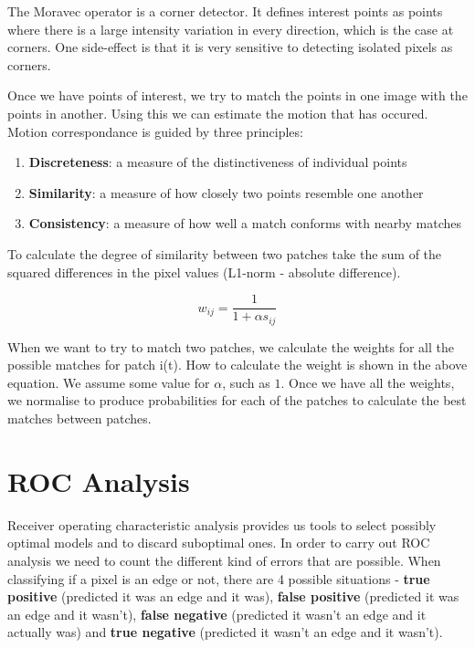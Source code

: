 \documentclass{article}
\begin{document}
	\par 
	The Moravec operator is a corner detector. It defines interest points as points where there is a large intensity variation in every direction, which is the case at corners. One side-effect is that it is very sensitive to detecting isolated pixels as corners.
	
	\par 
	Once we have points of interest, we try to match the points in one image with the points in another. Using this we can estimate the motion that has occured. Motion correspondance is guided by three principles:
	\begin{enumerate}
		\item \textbf{Discreteness}: a measure of the distinctiveness of individual points
		\item \textbf{Similarity}: a measure of how closely two points resemble one another
		\item \textbf{Consistency}: a measure of how well a match conforms with nearby matches
	\end{enumerate}
	
	To calculate the degree of similarity between two patches take the sum of the squared differences in the pixel values (L1-norm - absolute difference).
	
	\[ w_{ij} = \frac{1}{1 + \alpha s_{ij}} \]
	
	When we want to try to match two patches, we calculate the weights for all the possible matches for patch i(t). How to calculate the weight is shown in the above equation. We assume some value for $\alpha$, such as $1$. Once we have all the weights, we normalise to produce probabilities for each of the patches to calculate the best matches between patches.
	

	\section{ROC Analysis}
	Receiver operating characteristic analysis provides us tools to select possibly optimal models and to discard suboptimal ones. In order to carry out ROC analysis we need to count the different kind of errors that are possible. When classifying if a pixel is an edge or not, there are 4 possible situations - \textbf{true positive} (predicted it was an edge and it was), \textbf{false positive} (predicted it was an edge and it wasn't), \textbf{false negative} (predicted it wasn't an edge and it actually was) and \textbf{true negative} (predicted it wasn't an edge and it wasn't).
	
\end{document}
